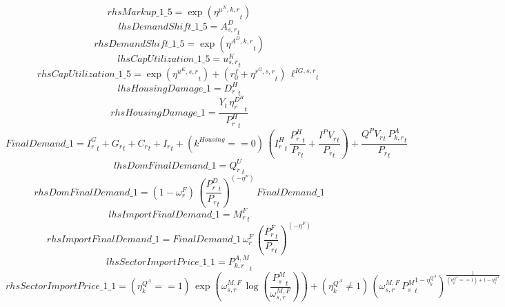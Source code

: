 \begin{dmath*}
rhsMarkup\_1\_5 = \exp\left({{\eta^{\mu^{N},k,r}}}_{t}\right)
\end{dmath*}
\begin{dmath*}
lhsDemandShift\_1\_5 = {{A^{D}_{s,r}}}_{t}
\end{dmath*}
\begin{dmath*}
rhsDemandShift\_1\_5 = \exp\left({{\eta^{A^{D},k,r}}}_{t}\right)
\end{dmath*}
\begin{dmath*}
lhsCapUtilization\_1\_5 = {{u^K_{s,r}}}_{t}
\end{dmath*}
\begin{dmath*}
rhsCapUtilization\_1\_5 = \exp\left({{\eta^{u^K,s,r}}}_{t}\right)+\left({{r^f_0}}+{{\eta^{r^G,s,r}}}_{t}\right)\, {{\ell^{IG,s,r}}}_{t}
\end{dmath*}
\begin{dmath*}
lhsHousingDamage\_1 = {{D^H_r}}_{t}
\end{dmath*}
\begin{dmath*}
rhsHousingDamage\_1 = \frac{{Y}_{t}\, {{\eta^{D^{H}}_r}}_{t}}{{{P^H_r}}_{t}}
\end{dmath*}
\begin{dmath*}
FinalDemand\_1 = {{I^G_{r}}}_{t}+{{G_{r}}}_{t}+{{C_r}}_{t}+{{I_{r}}}_{t}+\left({{k^{Housing}}}==0\right)\, \left({{I^H_r}}_{t}\, \frac{{{P^H_r}}_{t}}{{{P_{r}}}_{t}}+\frac{{{I^PV_r}}_{t}}{{{P_{r}}}_{t}}\right)+\frac{{{Q^PV_r}}_{t}\, {{P^{A}_{k,r}}}_{t}}{{{P_{r}}}_{t}}
\end{dmath*}
\begin{dmath*}
lhsDomFinalDemand\_1 = {{Q^{U}_{r}}}_{t}
\end{dmath*}
\begin{dmath*}
rhsDomFinalDemand\_1 = \left(1-{{\omega^{F}_{r}}}\right)\, \left(\frac{{{P^D_{r}}}_{t}}{{{P_{r}}}_{t}}\right)^{\left(-{{\eta^{F}}}\right)}\, {FinalDemand\_1}
\end{dmath*}
\begin{dmath*}
lhsImportFinalDemand\_1 = {{M^F_r}}_{t}
\end{dmath*}
\begin{dmath*}
rhsImportFinalDemand\_1 = {FinalDemand\_1}\, {{\omega^{F}_{r}}}\, \left(\frac{{{P^F_{r}}}_{t}}{{{P_{r}}}_{t}}\right)^{\left(-{{\eta^{F}}}\right)}
\end{dmath*}
\begin{dmath*}
lhsSectorImportPrice\_1\_1 = {{P^{A,M}_{k,r}}}_{t}
\end{dmath*}
\begin{dmath*}
rhsSectorImportPrice\_1\_1 = \left({{\eta^{Q^A}_{k}}}==1\right)\, \exp\left({{\omega^{M,F}_{s,r}}}\, \log\left(\frac{{{P^{M}_s}}_{t}}{{{\omega^{M,F}_{s,r}}}}\right)\right)+\left({{\eta^{Q^A}_{k}}}\neq 1\right)\, \left({{\omega^{M,F}_{s,r}}}\, {{P^{M}_s}}_{t}^{1-{{\eta^{Q^A}_{k}}}}\right)^{\frac{1}{\left({{\eta^{Q^A}_{k}}}==1\right)+1-{{\eta^{Q^A}_{k}}}}}
\end{dmath*}
